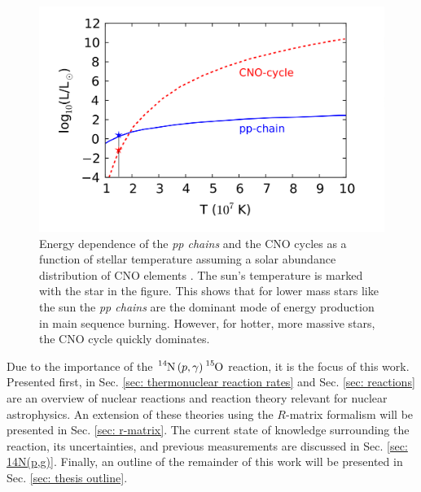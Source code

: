 \begin{figure}
\includegraphics[width=\linewidth]{figures/energyProduction.png}
\caption{Energy dependence of the \textit{pp chains} and the CNO cycles as a function of stellar temperature assuming a solar abundance distribution of CNO elements \cite{Bertulani2016}. The sun's temperature is marked with the star in the figure. This shows that for lower mass stars like the sun the \textit{pp chains} are the dominant mode of energy production in main sequence burning. However, for hotter, more massive stars, the CNO cycle quickly dominates. }
\label{fig: CNO-energy}
\end{figure}



Due to the importance of the $\ce{^{14}N} \left( p, \gamma \right) \ce{^{15}O}$ reaction, it is the focus of this work. Presented first, in Sec. \ref{sec: thermonuclear reaction rates} and Sec. \ref{sec: reactions} are an overview of nuclear reactions and reaction theory relevant for nuclear astrophysics. An extension of these theories using the $R$-matrix formalism will be presented in Sec. \ref{sec: r-matrix}. The current state of knowledge surrounding the reaction, its uncertainties, and previous measurements are discussed in Sec. \ref{sec: 14N(p,g)}. Finally, an outline of the remainder of this work will be presented in Sec. \ref{sec: thesis outline}.


